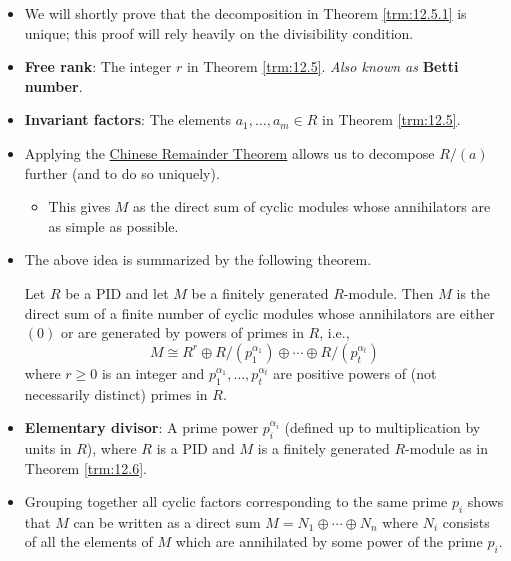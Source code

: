 \documentclass[../notes.tex]{subfiles}
\begin{document}
\begin{itemize}
\begin{theorem}
\begin{enumerate}[ref={\thetheorem(\arabic*)}]
\begin{equation*}
            \end{equation*}
            In particular, $M$ is a torsion module iff $r=0$ and in this case, the annihilator of $M$ is the ideal $(a_m)$.
        \end{enumerate}
        \begin{proof}
            Given.
        \end{proof}
    \end{theorem}
    \item We will shortly prove that the decomposition in Theorem \ref{trm:12.5.1} is unique; this proof will rely heavily on the divisibility condition.
    \item \textbf{Free rank}: The integer $r$ in Theorem \ref{trm:12.5}. \emph{Also known as} \textbf{Betti number}.
    \item \textbf{Invariant factors}: The elements $a_1,\dots,a_m\in R$ in Theorem \ref{trm:12.5}.
    \item Applying the \hyperref[trm:7.17]{Chinese Remainder Theorem} allows us to decompose $R/(a)$ further (and to do so uniquely).
    \begin{itemize}
        \item This gives $M$ as the direct sum of cyclic modules whose annihilators are as simple as possible.
    \end{itemize}
    \item The above idea is summarized by the following theorem.
    \begin{theorem}\label{trm:12.6}
        Let $R$ be a PID and let $M$ be a finitely generated $R$-module. Then $M$ is the direct sum of a finite number of cyclic modules whose annihilators are either $(0)$ or are generated by powers of primes in $R$, i.e.,
        \begin{equation*}
            M \cong R^r\oplus R/(p_1^{\alpha_1})\oplus\cdots\oplus R/(p_t^{\alpha_t})
        \end{equation*}
        where $r\geq 0$ is an integer and $p_1^{\alpha_1},\dots,p_t^{\alpha_t}$ are positive powers of (not necessarily distinct) primes in $R$.
    \end{theorem}
    \item \textbf{Elementary divisor}: A prime power $p_i^{\alpha_i}$ (defined up to multiplication by units in $R$), where $R$ is a PID and $M$ is a finitely generated $R$-module as in Theorem \ref{trm:12.6}.
    \item Grouping together all cyclic factors corresponding to the same prime $p_i$ shows that $M$ can be written as a direct sum $M=N_1\oplus\cdots\oplus N_n$ where $N_i$ consists of all the elements of $M$ which are annihilated by some power of the prime $p_i$.

\end{itemize}
\end{document}
